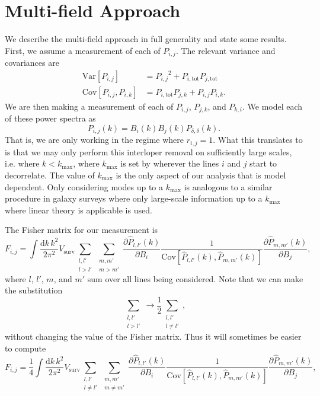 \documentclass{aastex62}
\newcommand{\beq}{\begin{equation}}
\newcommand{\eeq}{\end{equation}}
\newcommand{\denps}{\ensuremath{P_{\delta,\delta}}}
\newcommand{\xps}[2]{\ensuremath{P_{#1,#2}}}
\newcommand{\pstot}[1]{\ensuremath{P_{#1,\text{tot}}}}
\newcommand{\Var}[1]{\mathrm{Var}[#1]}
\newcommand{\Cov}[2]{\mathrm{Cov}[#1,#2]}
\begin{document}
\section{Multi-field Approach}\label{sec:theory}
We describe the multi-field approach in full generality and state some
results. First, we assume a measurement of each of $\xps{i}{j}$. The relevant
variance and covariances are \citep[e.g.][]{2015JCAP...03..034V}
\beq\label{eq:var_cov}
\begin{split}
\Var{\xps{i}{j}} &= \xps{i}{j}^2 + \pstot{i}\pstot{j} \\
\Cov{\xps{i}{j}}{\xps{i}{k}} &= \pstot{i}\xps{j}{k} +
\xps{i}{j}\xps{i}{k}\text{.}
\end{split}
\eeq
We are then making a measurement of each of $\xps{i}{j}$, $\xps{j}{k}$,
and $\xps{k}{i}$. We model each of these power spectra as
\beq
\xps{i}{j}(k) = B_i(k) B_j(k) \denps(k)\text{.}
\eeq
That is, we are only working in the regime where $r_{i,j}=1$. What this
translates to is that we may only perform this interloper removal on
sufficiently large scales, i.e. where $k<k_{\text{max}}$, where
$k_{\text{max}}$ is set by wherever the lines $i$ and $j$ start to
decorrelate. The value of $k_{\text{max}}$ is the only aspect of our analysis
that is model dependent. Only considering modes up to a $k_{\text{max}}$ is
analogous to a similar procedure in galaxy surveys where only large-scale
information up to a $k_{\text{max}}$ where linear theory is applicable is used.

The Fisher matrix for our measurement is
\beq\label{eq:fisher}
F_{i,j} = 
\int \frac{\text{d}k\,k^2}{2\pi^2} V_{\text{surv}} 
\sum_{\substack{l,l'\\l > l'}} \sum_{\substack{m,m'\\m > m'}}
\frac{\partial \hat{P}_{l,l'}(k)}{\partial B_i}
\frac{1}{\Cov{\hat{P}_{l,l'}(k)}{\hat{P}_{m,m'}(k)}} 
\frac{\partial \hat{P}_{m,m'}(k)}{\partial B_j}\text{,}
\eeq
where $l$, $l'$, $m$, and $m'$ sum over all lines being considered. Note that
we can make the substitution
\begin{equation*}
\sum_{\substack{l,l'\\l > l'}} \rightarrow 
\frac{1}{2} \sum_{\substack{l,l'\\l \neq l'}}\text{,}
\end{equation*}
without changing the value of the Fisher matrix. Thus it will sometimes be
easier to compute
\beq\label{eq:fisher4}
F_{i,j} = 
\frac{1}{4} \int \frac{\text{d}k\,k^2}{2\pi^2} V_{\text{surv}} 
\sum_{\substack{l,l'\\l \neq l'}} \sum_{\substack{m,m'\\m \neq m'}}
\frac{\partial \hat{P}_{l,l'}(k)}{\partial B_i}
\frac{1}{\Cov{\hat{P}_{l,l'}(k)}{\hat{P}_{m,m'}(k)}} 
\frac{\partial \hat{P}_{m,m'}(k)}{\partial B_j}\text{,}
\eeq
\end{document}
